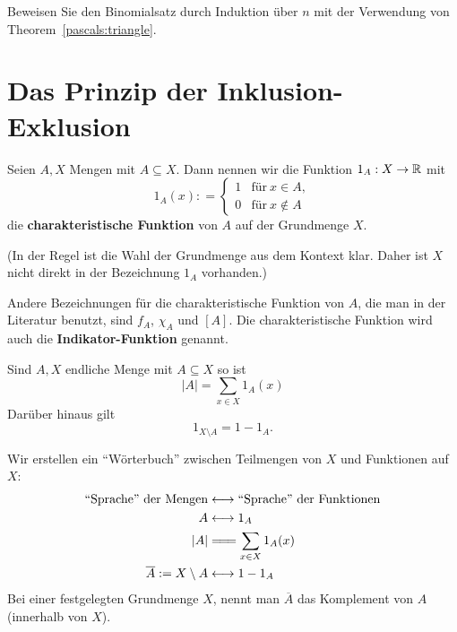 \begin{aufg}
	Beweisen Sie den Binomialsatz durch Induktion über $n$ mit der Verwendung von Theorem~\ref{pascals:triangle}. 
\end{aufg} 

\section{Das Prinzip der Inklusion-Exklusion} 

\begin{defn}
	Seien $A,X$ Mengen mit $A \subseteq X$. Dann nennen wir die Funktion $1_A : X \to \mathbb{R}$ mit 
	\[
		1_A(x): = \begin{cases}
				1 &  \text{für} \ x \in A, 
			\\	0 & \text{für} \ x \not\in A
			\end{cases} 
	\]
	die \textbf{charakteristische Funktion} von $A$ auf der Grundmenge $X$. 
	
	(In der Regel ist die Wahl der Grundmenge aus dem Kontext klar. Daher ist $X$ nicht direkt in der Bezeichnung $1_A$ vorhanden.)
\end{defn} 

\begin{bem}
	Andere Bezeichnungen für die charakteristische Funktion von $A$, die man in der Literatur benutzt, sind $f_A$, $\chi_A$ und $[A]$. Die charakteristische Funktion wird auch die \textbf{Indikator-Funktion} genannt. 
\end{bem} 

\begin{bem}
	Sind $A, X$ endliche Menge mit $A \subseteq X$ so ist 
	\[	
			|A| = \sum_{x \in X} 1_A(x)
	\] 
	Darüber hinaus gilt 
	\[	
		1_{X \setminus A} = 1 - 1_A. 
	\]
\end{bem}

\begin{bem} Wir erstellen ein ``Wörterbuch'' zwischen Teilmengen von $X$ und Funktionen auf $X$: 
	\begin{align*}
		\text{``Sprache'' der Mengen} & \longleftrightarrow \text{``Sprache'' der Funktionen} 
		\\ A & \longleftrightarrow 1_A
		\\ |A| & =\joinrel=\joinrel= \sum_{x \in X} 1_A(x)
		\\ \overline{A}:=X \setminus A & \longleftrightarrow 1 - 1_A
	\end{align*}
	Bei einer festgelegten Grundmenge $X$, nennt man $\overline{A}$ das Komplement von $A$ (innerhalb von $X$). 
\end{bem} 

